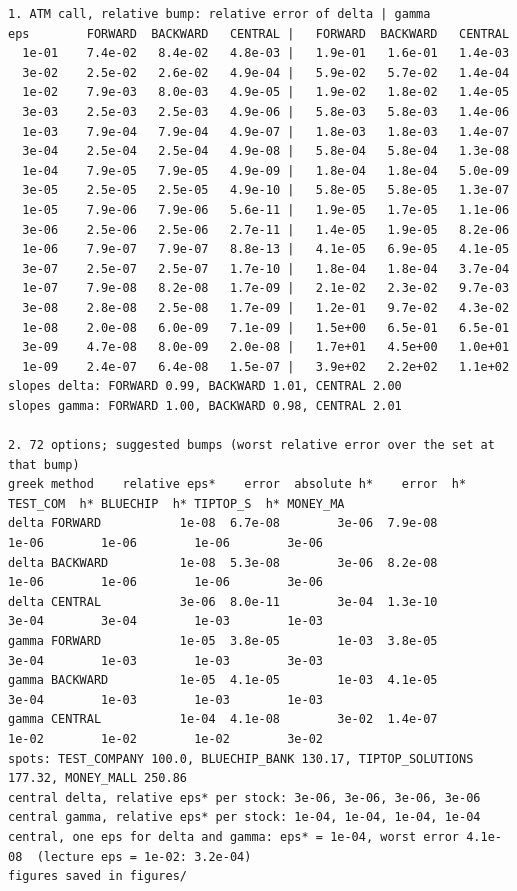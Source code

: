 \documentclass[11pt,a4paper]{article}
\begin{document}
\begin{lstlisting}[style=outsmall]
1. ATM call, relative bump: relative error of delta | gamma
eps        FORWARD  BACKWARD   CENTRAL |   FORWARD  BACKWARD   CENTRAL
  1e-01    7.4e-02   8.4e-02   4.8e-03 |   1.9e-01   1.6e-01   1.4e-03
  3e-02    2.5e-02   2.6e-02   4.9e-04 |   5.9e-02   5.7e-02   1.4e-04
  1e-02    7.9e-03   8.0e-03   4.9e-05 |   1.9e-02   1.8e-02   1.4e-05
  3e-03    2.5e-03   2.5e-03   4.9e-06 |   5.8e-03   5.8e-03   1.4e-06
  1e-03    7.9e-04   7.9e-04   4.9e-07 |   1.8e-03   1.8e-03   1.4e-07
  3e-04    2.5e-04   2.5e-04   4.9e-08 |   5.8e-04   5.8e-04   1.3e-08
  1e-04    7.9e-05   7.9e-05   4.9e-09 |   1.8e-04   1.8e-04   5.0e-09
  3e-05    2.5e-05   2.5e-05   4.9e-10 |   5.8e-05   5.8e-05   1.3e-07
  1e-05    7.9e-06   7.9e-06   5.6e-11 |   1.9e-05   1.7e-05   1.1e-06
  3e-06    2.5e-06   2.5e-06   2.7e-11 |   1.4e-05   1.9e-05   8.2e-06
  1e-06    7.9e-07   7.9e-07   8.8e-13 |   4.1e-05   6.9e-05   4.1e-05
  3e-07    2.5e-07   2.5e-07   1.7e-10 |   1.8e-04   1.8e-04   3.7e-04
  1e-07    7.9e-08   8.2e-08   1.7e-09 |   2.1e-02   2.3e-02   9.7e-03
  3e-08    2.8e-08   2.5e-08   1.7e-09 |   1.2e-01   9.7e-02   4.3e-02
  1e-08    2.0e-08   6.0e-09   7.1e-09 |   1.5e+00   6.5e-01   6.5e-01
  3e-09    4.7e-08   8.0e-09   2.0e-08 |   1.7e+01   4.5e+00   1.0e+01
  1e-09    2.4e-07   6.4e-08   1.5e-07 |   3.9e+02   2.2e+02   1.1e+02
slopes delta: FORWARD 0.99, BACKWARD 1.01, CENTRAL 2.00
slopes gamma: FORWARD 1.00, BACKWARD 0.98, CENTRAL 2.01

2. 72 options; suggested bumps (worst relative error over the set at that bump)
greek method    relative eps*    error  absolute h*    error  h* TEST_COM  h* BLUECHIP  h* TIPTOP_S  h* MONEY_MA
delta FORWARD           1e-08  6.7e-08        3e-06  7.9e-08        1e-06        1e-06        1e-06        3e-06
delta BACKWARD          1e-08  5.3e-08        3e-06  8.2e-08        1e-06        1e-06        1e-06        3e-06
delta CENTRAL           3e-06  8.0e-11        3e-04  1.3e-10        3e-04        3e-04        1e-03        1e-03
gamma FORWARD           1e-05  3.8e-05        1e-03  3.8e-05        3e-04        1e-03        1e-03        3e-03
gamma BACKWARD          1e-05  4.1e-05        1e-03  4.1e-05        3e-04        1e-03        1e-03        1e-03
gamma CENTRAL           1e-04  4.1e-08        3e-02  1.4e-07        1e-02        1e-02        1e-02        3e-02
spots: TEST_COMPANY 100.0, BLUECHIP_BANK 130.17, TIPTOP_SOLUTIONS 177.32, MONEY_MALL 250.86
central delta, relative eps* per stock: 3e-06, 3e-06, 3e-06, 3e-06
central gamma, relative eps* per stock: 1e-04, 1e-04, 1e-04, 1e-04
central, one eps for delta and gamma: eps* = 1e-04, worst error 4.1e-08  (lecture eps = 1e-02: 3.2e-04)
figures saved in figures/
\end{lstlisting}
\end{document}
